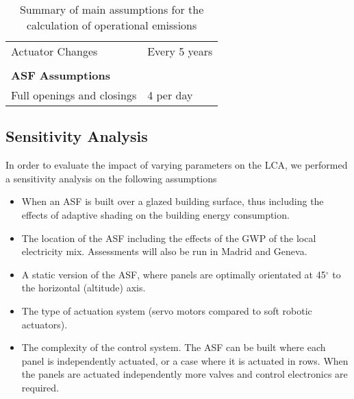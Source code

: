 \begin{description}
\begin{table}[H]
\begin{tabular}{ll}
Actuator Changes              & Every 5 years                                  \\
                              &                                                \\
\textbf{ASF Assumptions}         &                                                \\
Full openings and closings  & 4 per day                                      \\
\hline
\end{tabular}
\caption{Summary of main assumptions for the calculation of operational emissions}
\label{tab:AssumptionsOpp4}
\end{table}


\end{description}



\subsection{Sensitivity Analysis}
\label{ch:meth:sens}

In order to evaluate the impact of varying parameters on the LCA, we performed a sensitivity analysis on the following assumptions
\begin{itemize}
\item When an ASF is built over a glazed building surface, thus including the effects of adaptive shading on the building energy consumption.
\item The location of the ASF including the effects of the GWP of the local electricity mix. Assessments will also be run in Madrid and Geneva.
\item A static version of the ASF, where panels are optimally orientated at 45$^{\circ}$ to the horizontal (altitude) axis.
\item The type of actuation system (servo motors compared to soft robotic actuators).
\item The complexity of the control system. The ASF can be built where each panel is independently actuated, or a case where it is actuated in rows. When the panels are actuated independently more valves and control electronics are required.

\end{itemize}
